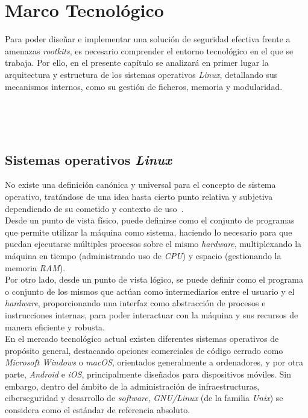 \chapter{Marco Tecnológico}
\label{cap:capitulo2}

Para poder diseñar e implementar una solución de seguridad efectiva frente a amenazas \textit{rootkits}, es necesario comprender el entorno tecnológico en el que se trabaja.
Por ello, en el presente capítulo se analizará en primer lugar la arquitectura y estructura de los sistemas operativos \textit{Linux}, detallando sus mecanismos internos, como su gestión de ficheros, memoria y modularidad.

\

\

\section{Sistemas operativos \textit{Linux}}
\label{sec:linux}

No existe una definición canónica y universal para el concepto de sistema operativo, tratándose de una idea hasta cierto punto relativa y subjetiva dependiendo de su cometido y contexto de uso~\cite{librossoo}.\\

Desde un punto de vista físico, puede definirse como el conjunto de programas que permite utilizar la máquina como sistema, haciendo lo necesario para que puedan ejecutarse múltiples procesos sobre el mismo \textit{hardware}, multiplexando la máquina en tiempo (administrando uso de \textit{CPU}) y espacio (gestionando la memoria \textit{RAM}).\\

Por otro lado, desde un punto de vista lógico, se puede definir como el programa o conjunto de los mismos que actúan como intermediarios entre el usuario y el \textit{hardware}, proporcionando una interfaz como abstracción de procesos e instrucciones internas, para poder interactuar con la máquina y sus recursos de manera eficiente y robusta.\\

En el mercado tecnológico actual existen diferentes sistemas operativos de propósito general, destacando opciones comerciales de código cerrado como \textit{Microsoft Windows} o \textit{macOS}, orientados generalmente a ordenadores, y por otra parte, \textit{Android} e \textit{iOS}, principalmente diseñados para dispositivos móviles. Sin embargo, dentro del ámbito de la administración de infraestructuras, ciberseguridad y desarrollo de \textit{software}, \textit{GNU/Linux} (de la familia \textit{Unix}) se considera como el estándar de referencia absoluto.\\

